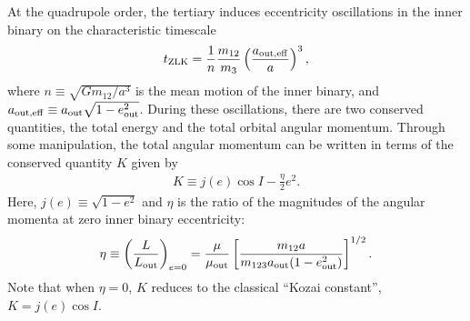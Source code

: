 \documentclass[
        fleqn,
        usenatbib,
    ]{mnras}
\newcommand*{\p}[1]{\left(#1\right)}
\newcommand*{\s}[1]{\left[#1\right]}
\begin{document}
At the quadrupole order, the tertiary induces eccentricity oscillations in the
inner binary on the characteristic timescale
\begin{align}
    t_{\rm ZLK} = \frac{1}{n}\frac{m_{12}}{m_3}
            \p{\frac{a_{\rm out, eff}}{a}}^3,\label{eq:def_tzlk}
\end{align}
where $n \equiv \sqrt{Gm_{12} / a^3}$ is the mean motion of the inner binary,
and $a_{\rm out, eff} \equiv a_{\rm out}\sqrt{1 - e_{\rm out}^2}$. During these
oscillations, there are two conserved quantities, the total energy and the total
orbital angular momentum. Through some manipulation, the total angular momentum
can be written in terms of the conserved quantity $K$ given by
\begin{align}
    K \equiv j(e) \cos I - \frac{\eta}{2}e^2.\label{eq:def_K}
\end{align}
Here, $j(e) \equiv \sqrt{1 - e^2}$ and $\eta$ is the ratio of the magnitudes of
the angular momenta at zero inner binary eccentricity:
\begin{align}
    \eta \equiv \p{\frac{L}{L_{\rm out}}}_{e = 0}
        = \frac{\mu}{\mu_{\rm out}}\s{\frac{m_{12}a}
            {m_{123}a_{\rm out}(1 - e_{\rm out}^2)}}^{1/2}.\label{eq:def_eta}
\end{align}
Note that when $\eta = 0$, $K$ reduces to the classical ``Kozai constant'', $K =
j(e) \cos I$.
\end{document}
